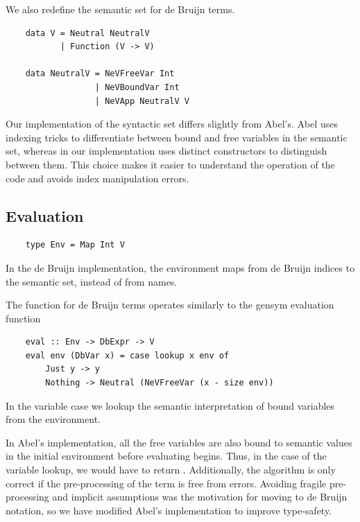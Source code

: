 We also redefine the semantic set for de Bruijn terms.

\begin{lstlisting}
    data V = Neutral NeutralV
           | Function (V -> V)

    data NeutralV = NeVFreeVar Int
                  | NeVBoundVar Int
                  | NeVApp NeutralV V
\end{lstlisting}

Our implementation of the syntactic set differs slightly from Abel's. Abel uses indexing tricks to differentiate between bound and free variables in the semantic set, whereas in our implementation uses distinct constructors to distinguish between them. This choice makes it easier to understand the operation of the code and avoids index manipulation errors.


\subsection{Evaluation}

\begin{lstlisting}
    type Env = Map Int V
\end{lstlisting}

In the de Bruijn implementation, the environment maps from de Bruijn indices to the semantic set, instead of from names.

The  function for de Bruijn terms operates similarly to the gensym evaluation function

\begin{lstlisting}
    eval :: Env -> DbExpr -> V
    eval env (DbVar x) = case lookup x env of
        Just y -> y
        Nothing -> Neutral (NeVFreeVar (x - size env))
\end{lstlisting}

In the variable case we lookup the semantic interpretation of bound variables from the environment. 

In Abel's implementation, all the free variables are also bound to semantic values in the initial environment before evaluating begins. Thus, in the  case of the variable lookup, we would have to return . Additionally, the algorithm is only correct if the pre-processing of the term is free from errors. Avoiding fragile pre-processing and implicit assumptions was the motivation for moving to de Bruijn notation, so we have modified Abel's implementation to improve type-safety.

